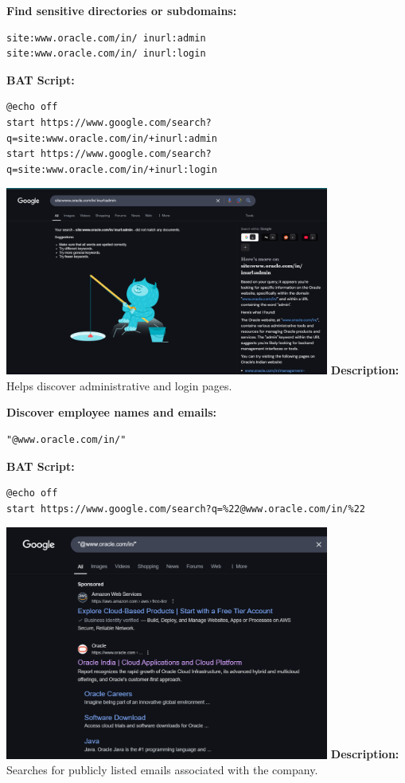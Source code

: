 \documentclass{article}
\begin{document}
\textbf{Find sensitive directories or subdomains:}
\begin{lstlisting}
site:www.oracle.com/in/ inurl:admin
site:www.oracle.com/in/ inurl:login
\end{lstlisting}
\textbf{BAT Script:}
\begin{lstlisting}
@echo off
start https://www.google.com/search?q=site:www.oracle.com/in/+inurl:admin
start https://www.google.com/search?q=site:www.oracle.com/in/+inurl:login
\end{lstlisting}
\includegraphics[width=0.8\textwidth]{images/sensitive_dirs.png}
\newline
\textbf{Description:} Helps discover administrative and login pages.

\textbf{Discover employee names and emails:}
\begin{lstlisting}
"@www.oracle.com/in/"
\end{lstlisting}
\textbf{BAT Script:}
\begin{lstlisting}
@echo off
start https://www.google.com/search?q=%22@www.oracle.com/in/%22
\end{lstlisting}
\includegraphics[width=0.8\textwidth]{images/email_search.png}
\textbf{Description:} Searches for publicly listed emails associated with the company.
\end{document}
